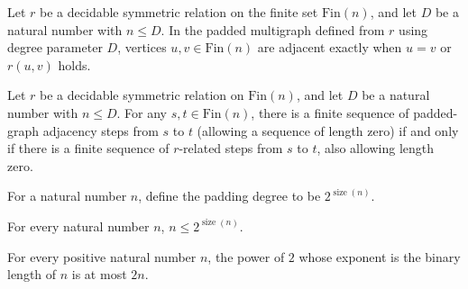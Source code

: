 \begin{theorem}
\label{Randomized.padGraph_adj_iff}
\leanok
{}
Let $r$ be a decidable symmetric relation on the finite set $\text{Fin}(n)$, and let $D$
be a natural number with $n \le D$. In the padded multigraph defined from $r$ using
degree parameter $D$, vertices $u,v \in \text{Fin}(n)$ are adjacent exactly when $u=v$
or $r(u,v)$ holds.
\end{theorem}

\begin{theorem}
\label{Randomized.padGraph_reflTransGen_iff}
\leanok
{}
Let $r$ be a decidable symmetric relation on $\text{Fin}(n)$, and let $D$ be a natural
number with $n \le D$. For any $s,t \in \text{Fin}(n)$, there is a finite sequence of
padded-graph adjacency steps from $s$ to $t$ (allowing a sequence of length zero) if and
only if there is a finite sequence of $r$-related steps from $s$ to $t$, also allowing
length zero.
\end{theorem}

\begin{definition}
\label{Randomized.padDegree}
\leanok
For a natural number $n$, define the padding degree to be $2^{\operatorname{size}(n)}$.
\end{definition}

\begin{theorem}
\label{Randomized.le_padDegree}
\leanok
{}
For every natural number $n$, $n\leq 2^{\operatorname{size}(n)}$.
\end{theorem}

\begin{theorem}
\label{Randomized.padDegree_le}
\leanok
{}
For every positive natural number $n$, the power of $2$ whose exponent is the binary
length of $n$ is at most $2n$.
\end{theorem}

